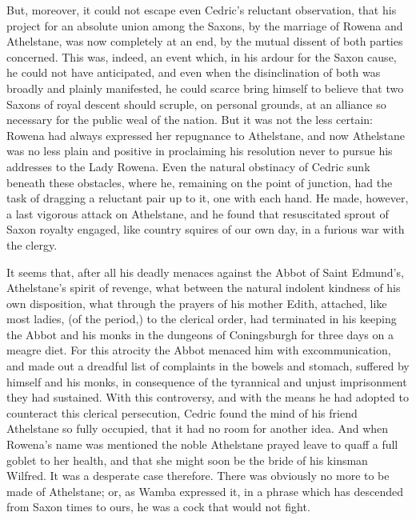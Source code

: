 But, moreover, it could not escape even Cedric's reluctant observation,
that his project for an absolute union among the Saxons, by the marriage
of Rowena and Athelstane, was now completely at an end, by the mutual
dissent of both parties concerned. This was, indeed, an event which, in
his ardour for the Saxon cause, he could not have anticipated, and even
when the disinclination of both was broadly and plainly manifested, he
could scarce bring himself to believe that two Saxons of royal descent
should scruple, on personal grounds, at an alliance so necessary for the
public weal of the nation. But it was not the less certain: Rowena had
always expressed her repugnance to Athelstane, and now Athelstane was no
less plain and positive in proclaiming his resolution never to pursue
his addresses to the Lady Rowena. Even the natural obstinacy of Cedric
sunk beneath these obstacles, where he, remaining on the point of
junction, had the task of dragging a reluctant pair up to it, one with
each hand. He made, however, a last vigorous attack on Athelstane, and
he found that resuscitated sprout of Saxon royalty engaged, like country
squires of our own day, in a furious war with the clergy.

It seems that, after all his deadly menaces against the Abbot of Saint
Edmund's, Athelstane's spirit of revenge, what between the natural
indolent kindness of his own disposition, what through the prayers of
his mother Edith, attached, like most ladies, (of the period,) to the
clerical order, had terminated in his keeping the Abbot and his monks in
the dungeons of Coningsburgh for three days on a meagre diet. For this
atrocity the Abbot menaced him with excommunication, and made out a
dreadful list of complaints in the bowels and stomach, suffered by
himself and his monks, in consequence of the tyrannical and unjust
imprisonment they had sustained. With this controversy, and with the
means he had adopted to counteract this clerical persecution, Cedric
found the mind of his friend Athelstane so fully occupied, that it had
no room for another idea. And when Rowena's name was mentioned the noble
Athelstane prayed leave to quaff a full goblet to her health, and that
she might soon be the bride of his kinsman Wilfred. It was a desperate
case therefore. There was obviously no more to be made of Athelstane;
or, as Wamba expressed it, in a phrase which has descended from Saxon
times to ours, he was a cock that would not fight.


